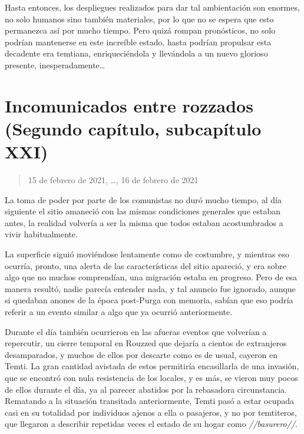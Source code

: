 \documentclass[
  spanish,
]{book}
\begin{document}
Hasta entonces, los despliegues realizados para dar tal ambientación son enormes, no solo humanos sino también materiales, por lo que no se espera que esto permanezca así por mucho tiempo. Pero quizá rompan pronósticos, no solo podrían mantenerse en este increíble estado, hasta podrían propulsar esta decadente era temtiana, enriqueciéndola y llevándola a un nuevo glorioso presente, inesperadamente\ldots{}

\hypertarget{incomunicados-entre-rozzados-segundo-capuxedtulo-subcapuxedtulo-xxi}{%
\section{Incomunicados entre rozzados (Segundo capítulo, subcapítulo XXI)}\label{incomunicados-entre-rozzados-segundo-capuxedtulo-subcapuxedtulo-xxi}}

\begin{quote}
15 de febrero de 2021, \ldots, 16 de febrero de 2021
\end{quote}

La toma de poder por parte de los comunistas no duró mucho tiempo, al día siguiente el sitio amaneció con las mismas condiciones generales que estaban antes, la realidad volvería a ser la misma que todos estaban acostumbrados a vivir habitualmente.

La superficie siguió moviéndose lentamente como de costumbre, y mientras eso ocurría, pronto, una alerta de las características del sitio apareció, y era sobre algo que no muchos comprendían, una migración estaba en progreso. Pero de esa manera resultó, nadie parecía entender nada, y tal anuncio fue ignorado, aunque si quedaban anones de la época post-Purga con memoria, sabían que eso podría referir a un evento similar a algo que ya ocurrió anteriormente.

Durante el día también ocurrieron en las afueras eventos que volverían a repercutir, un cierre temporal en Rouzzed que dejaría a cientos de extranjeros desamparados, y muchos de ellos por descarte como es de usual, cayeron en Temti. La gran cantidad avistada de estos permitiría encasillarla de una invasión, que se encontró con nula resistencia de los locales, y es más, se vieron muy pocos de ellos durante el día, ya al parecer abatidos por la rebasadora circunstancia. Rematando a la situación transitada anteriormente, Temti pasó a estar ocupada casi en su totalidad por individuos ajenos a ella o pasajeros, y no por temtiteros, que llegaron a describir repetidas veces el estado de su hogar como \emph{//basurero//}.
\end{document}
